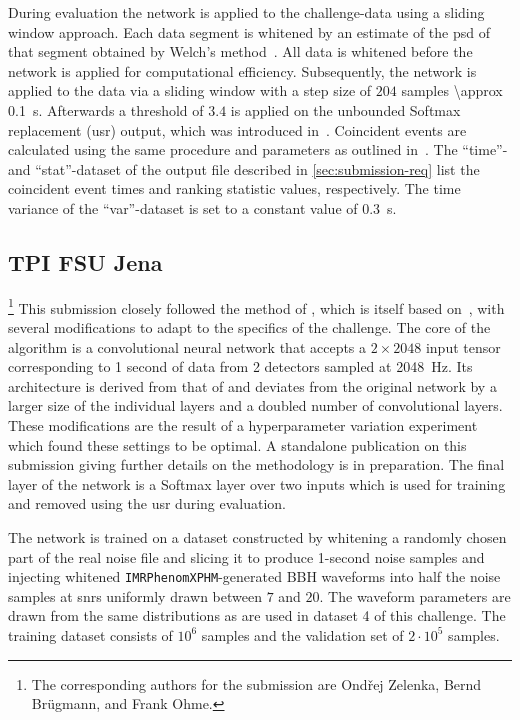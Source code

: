 During evaluation the network is applied to the challenge-data using a sliding window approach. Each data segment is whitened by an estimate of the \acrshort{psd} of that segment obtained by Welch's method~\cite{Allen:2005fk, Welch:1967aaa}. All data is whitened before the network is applied for computational efficiency. Subsequently, the network is applied to the data via a sliding window with a step size of $204$ samples \SI[parse-numbers=false]{\approx 0.1}{\second}. Afterwards a threshold of $3.4$ is applied on the unbounded Softmax replacement (\acrshort{usr}) output, which was introduced in~\cite{Schafer:2021fea}. Coincident events are calculated using the same procedure and parameters as outlined in~\cite{Schafer:2021cml}. The ``time''- and ``stat''-dataset of the output file described in \autoref{sec:submission-req} list the coincident event times and ranking statistic values, respectively. The time variance of the ``var''-dataset is set to a constant value of \SI{0.3}{\second}.


\subsection{TPI FSU Jena}\label{sec:submission-jena}
\footnote{The corresponding authors for the \jena submission are Ond{\v{r}}ej Zelenka, Bernd Br{\"u}gmann, and Frank Ohme.}
This submission closely followed the method of \cite{Schafer:2021fea}, which is itself based on~\cite{Gabbard:2017lja}, with several modifications to adapt to the specifics of the challenge. The core of the algorithm is a convolutional neural network that accepts a $2\times 2048$ input tensor corresponding to 1 second of data from 2 detectors sampled at \SI{2048}{\hertz}. Its architecture is derived from that of \cite{Schafer:2021fea} and deviates from the original network by a larger size of the individual layers and a doubled number of convolutional layers. These modifications are the result of a hyperparameter variation experiment which found these settings to be optimal. A standalone publication on this submission giving further details on the methodology is in preparation. The final layer of the network is a Softmax layer over two inputs which is used for training and removed using the \acrshort{usr} \cite{Schafer:2021fea} during evaluation.

The network is trained on a dataset constructed by whitening a randomly chosen part of the real noise file and slicing it to produce 1-second noise samples and injecting whitened \texttt{IMRPhenomXPHM}-generated BBH waveforms into half the noise samples at \acrshort{snr}s uniformly drawn between $7$ and $20$. The waveform parameters are drawn from the same distributions as are used in dataset 4 of this challenge. The training dataset consists of $10^6$ samples and the validation set of $2\cdot 10^5$ samples.


